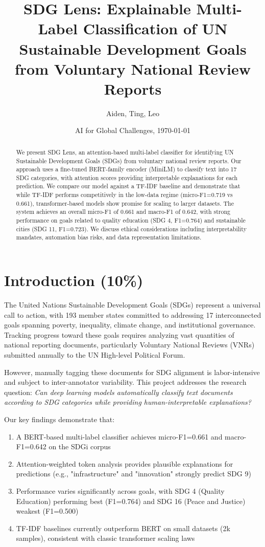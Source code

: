 \documentclass[12pt,a4paper]{article}
\title{SDG Lens: Explainable Multi-Label Classification of UN Sustainable Development Goals from Voluntary National Review Reports}
\author{Aiden, Ting, Leo}
\date{AI for Global Challenges, \today}
\begin{document}
\maketitle

\begin{abstract}
We present SDG Lens, an attention-based multi-label classifier for identifying UN Sustainable Development Goals (SDGs) from voluntary national review reports. Our approach uses a fine-tuned BERT-family encoder (MiniLM) to classify text into 17 SDG categories, with attention scores providing interpretable explanations for each prediction. We compare our model against a TF-IDF baseline and demonstrate that while TF-IDF performs competitively in the low-data regime (micro-F1=0.719 vs 0.661), transformer-based models show promise for scaling to larger datasets. The system achieves an overall micro-F1 of 0.661 and macro-F1 of 0.642, with strong performance on goals related to quality education (SDG 4, F1=0.764) and sustainable cities (SDG 11, F1=0.723). We discuss ethical considerations including interpretability mandates, automation bias risks, and data representation limitations.
\end{abstract}

\section{Introduction (10\%)}

The United Nations Sustainable Development Goals (SDGs) represent a universal call to action, with 193 member states committed to addressing 17 interconnected goals spanning poverty, inequality, climate change, and institutional governance. Tracking progress toward these goals requires analyzing vast quantities of national reporting documents, particularly Voluntary National Reviews (VNRs) submitted annually to the UN High-level Political Forum.

However, manually tagging these documents for SDG alignment is labor-intensive and subject to inter-annotator variability. This project addresses the research question: \textit{Can deep learning models automatically classify text documents according to SDG categories while providing human-interpretable explanations?}

Our key findings demonstrate that:
\begin{enumerate}
    \item A BERT-based multi-label classifier achieves micro-F1=0.661 and macro-F1=0.642 on the SDGi corpus
    \item Attention-weighted token analysis provides plausible explanations for predictions (e.g., "infrastructure" and "innovation" strongly predict SDG 9)
    \item Performance varies significantly across goals, with SDG 4 (Quality Education) performing best (F1=0.764) and SDG 16 (Peace and Justice) weakest (F1=0.500)
    \item TF-IDF baselines currently outperform BERT on small datasets (2k samples), consistent with classic transformer scaling laws
\end{enumerate}
\end{document}
